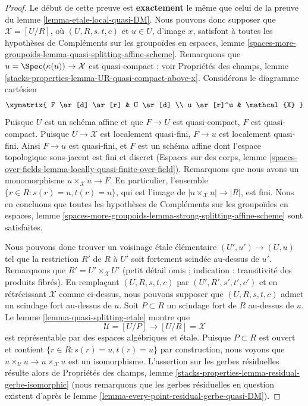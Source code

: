 \begin{proof}
Le d\'ebut de cette preuve est {\bf exactement} le m\^eme que celui de la preuve
du lemme \ref{lemma-etale-local-quasi-DM}.
Nous pouvons donc supposer que $\mathcal{X} = [U/R]$, o\`u $(U, R, s, t, c)$
et $u \in U$, d'image $x$, satisfont \`a toutes les hypoth\`eses de
Compl\'ements sur les groupo\"ides en espaces, lemme
\ref{spaces-more-groupoids-lemma-quasi-splitting-affine-scheme}.
Remarquons que $u = \Spec(\kappa(u)) \to \mathcal{X}$ est quasi-compact ; voir
Propri\'et\'es des champs, lemme
\ref{stacks-properties-lemma-UR-quasi-compact-above-x}.
Consid\'erons le diagramme cart\'esien
$$
\xymatrix{
F \ar[d] \ar[r] & U \ar[d] \\
u \ar[r]^u & \mathcal{X}
}
$$
Puisque $U$ est un sch\'ema affine et que $F \to U$ est quasi-compact,
$F$ est quasi-compact. Puisque $U \to \mathcal{X}$
est localement quasi-fini, $F \to u$ est
localement quasi-fini. Ainsi $F \to u$ est quasi-fini,
et $F$ est un sch\'ema affine dont l'espace topologique
sous-jacent est fini et discret (Espaces sur des corps, lemme
\ref{spaces-over-fields-lemma-locally-quasi-finite-over-field}).
Remarquons que nous avons un monomorphisme $u \times_\mathcal{X} u \to F$.
En particulier, l'ensemble $\{r \in R : s(r) = u, t(r) = u\}$,
qui est l'image de $|u \times_\mathcal{X} u| \to |R|$,
est fini. Nous en concluons que toutes les hypoth\`eses de
Compl\'ements sur les groupo\"ides en espaces, lemme
\ref{spaces-more-groupoids-lemma-strong-splitting-affine-scheme}
sont satisfaites.

\medskip\noindent
Nous pouvons donc trouver un voisinage \'etale \'el\'ementaire
$(U', u') \to (U, u)$ tel que la restriction $R'$ de $R$ \`a $U'$
soit fortement scind\'ee au-dessus de $u'$. Remarquons que $R' = U' \times_\mathcal{X} U'$
(petit d\'etail omis ; indication : transitivit\'e des produits fibr\'es).
En rempla\c{c}ant $(U, R, s, t, c)$ par $(U', R', s', t', c')$ et en r\'etr\'ecissant
$\mathcal{X}$ comme ci-dessus, nous pouvons supposer que $(U, R, s, t, c)$ admet
un scindage fort au-dessus de $u$. Soit $P \subset R$ un scindage fort
de $R$ au-dessus de $u$. Le lemme \ref{lemma-quasi-splitting-etale} montre que
$$
\mathcal{U} = [U/P] \longrightarrow [U/R] = \mathcal{X}
$$
est repr\'esentable par des espaces alg\'ebriques et \'etale. Puisque $P \subset R$
est ouvert et contient $\{r \in R : s(r) = u, t(r) = u\}$ par construction,
nous voyons que
$u \times_\mathcal{U} u \to u \times_\mathcal{X} u$ est un isomorphisme.
L'assertion sur les gerbes r\'esiduelles r\'esulte alors de
Propri\'et\'es des champs, lemme
\ref{stacks-properties-lemma-residual-gerbe-isomorphic}
(nous remarquons que les gerbes r\'esiduelles en question existent d'apr\`es
le lemme \ref{lemma-every-point-residual-gerbe-quasi-DM}).
\end{proof}



